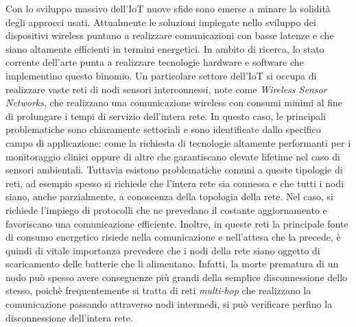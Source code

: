 \documentclass[binding=0.6cm,TFA]{sapthesis}
\begin{document}
Con lo sviluppo massivo dell'IoT nuove sfide sono emerse a minare la solidità degli approcci usati. Attualmente le soluzioni impiegate nello sviluppo
dei dispositivi wireless puntano a realizzare comunicazioni con basse latenze e che siano altamente efficienti in termini energetici. In ambito di ricerca,
lo stato corrente dell'arte punta a realizzare tecnologie hardware e software che implementino questo binomio. Un particolare
settore dell'IoT si occupa di realizzare vaste reti di nodi sensori interconnessi, note come \emph{Wireless Sensor Networks},
che realizzano una comunicazione wireless con consumi minimi al fine di prolungare i tempi di servizio dell'intera rete. In questo caso,
le principali problematiche sono chiaramente settoriali e sono identificate dallo specifico campo di applicazione: come la richiesta di tecnologie
altamente performanti per i monitoraggio clinici oppure di altre che garantiscano elevate lifetime nel caso di sensori ambientali. Tuttavia esistono
problematiche comuni a queste tipologie di reti, ad esempio spesso si richiede che l'intera rete sia connessa e che tutti i nodi siano,
anche parzialmente, a conoscenza della topologia della rete. Nel caso, si richiede l'impiego di protocolli che ne prevedano il
costante aggiornamento e favoriscano una comunicazione efficiente. Inoltre, in queste reti la principale fonte di consumo energetico risiede
nella comunicazione e nell'attesa che la precede, è quindi di vitale importanza prevedere che i nodi della rete siano
oggetto di scaricamento delle batterie che li alimentano. Infatti, la morte prematura di un nodo può spesso avere conseguenze più grandi della semplice
disconnessione dello stesso, poichè frequentemente si tratta di reti \emph{multi-hop} che realizzano la comunicazione passando attraverso nodi intermedi, si può
verificare perfino la disconnessione dell'intera rete.\\
\end{document}
